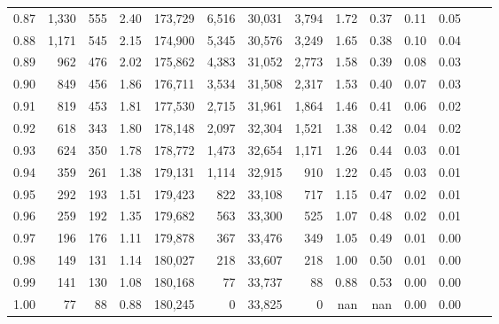 \begin{tabular}{rrrrrrrrrrrrrr}
0.87 &  1,330 &  555 &    2.40 &  173,729 &    6,516 &  30,031 &   3,794 &  1.72 &  0.37 &  0.11 &      0.05 \\
0.88 &  1,171 &  545 &    2.15 &  174,900 &    5,345 &  30,576 &   3,249 &  1.65 &  0.38 &  0.10 &      0.04 \\
0.89 &    962 &  476 &    2.02 &  175,862 &    4,383 &  31,052 &   2,773 &  1.58 &  0.39 &  0.08 &      0.03 \\
0.90 &    849 &  456 &    1.86 &  176,711 &    3,534 &  31,508 &   2,317 &  1.53 &  0.40 &  0.07 &      0.03 \\
0.91 &    819 &  453 &    1.81 &  177,530 &    2,715 &  31,961 &   1,864 &  1.46 &  0.41 &  0.06 &      0.02 \\
0.92 &    618 &  343 &    1.80 &  178,148 &    2,097 &  32,304 &   1,521 &  1.38 &  0.42 &  0.04 &      0.02 \\
0.93 &    624 &  350 &    1.78 &  178,772 &    1,473 &  32,654 &   1,171 &  1.26 &  0.44 &  0.03 &      0.01 \\
0.94 &    359 &  261 &    1.38 &  179,131 &    1,114 &  32,915 &     910 &  1.22 &  0.45 &  0.03 &      0.01 \\
0.95 &    292 &  193 &    1.51 &  179,423 &      822 &  33,108 &     717 &  1.15 &  0.47 &  0.02 &      0.01 \\
0.96 &    259 &  192 &    1.35 &  179,682 &      563 &  33,300 &     525 &  1.07 &  0.48 &  0.02 &      0.01 \\
0.97 &    196 &  176 &    1.11 &  179,878 &      367 &  33,476 &     349 &  1.05 &  0.49 &  0.01 &      0.00 \\
0.98 &    149 &  131 &    1.14 &  180,027 &      218 &  33,607 &     218 &  1.00 &  0.50 &  0.01 &      0.00 \\
0.99 &    141 &  130 &    1.08 &  180,168 &       77 &  33,737 &      88 &  0.88 &  0.53 &  0.00 &      0.00 \\
1.00 &     77 &   88 &    0.88 &  180,245 &        0 &  33,825 &       0 &   nan &   nan &  0.00 &      0.00 \\
\bottomrule
\end{tabular}

